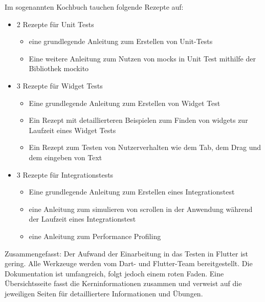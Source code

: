 Im sogenannten Kochbuch tauchen folgende Rezepte auf:

\begin{itemize}
    \item 2 Rezepte für Unit Tests
    \begin{itemize} 
       \item eine grundlegende Anleitung zum Erstellen von Unit-Tests 
       \item Eine weitere Anleitung zum Nutzen von mocks in Unit Test mithilfe der Bibliothek mockito 
    \end{itemize}
    \item 3 Rezepte für Widget Tests
    \begin{itemize} 
        \item Eine grundlegende Anleitung zum Erstellen von Widget Test 
        \item Ein Rezept mit detaillierteren Beispielen zum Finden von widgets  zur Laufzeit eines Widget Tests 
        \item Ein Rezept zum Testen von Nutzerverhalten wie dem Tab, dem Drag und dem eingeben von Text 
     \end{itemize}
    \item 3 Rezepte für Integrationstests
    \begin{itemize} 
        \item Eine grundlegende Anleitung zum Erstellen eines Integrationstest 
        \item eine Anleitung zum simulieren von scrollen in der Anwendung während der Laufzeit eines Integrationstest 
        \item eine Anleitung zum Performance Profiling 
     \end{itemize}
\end{itemize}

Zusammengefasst: Der Aufwand der Einarbeitung in das Testen in Flutter ist gering. Alle Werkzeuge werden vom Dart- und Flutter-Team bereitgestellt. Die Dokumentation ist umfangreich, folgt jedoch einem roten Faden. Eine Übersichtsseite fasst die Kerninformationen zusammen und verweist auf die jeweiligen  Seiten für detailliertere Informationen und Übungen.